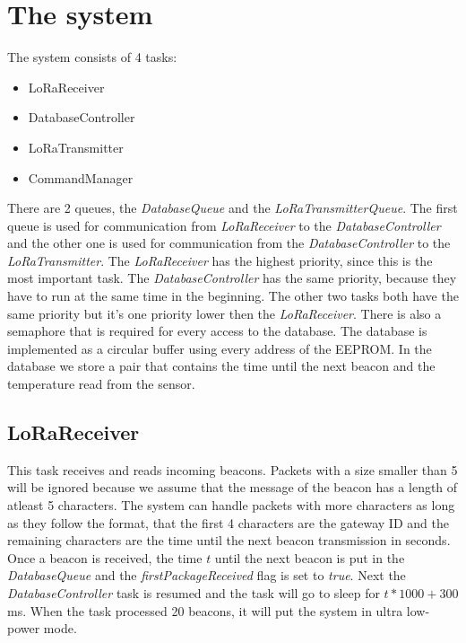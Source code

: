 \documentclass{scrartcl}
\begin{document}


\pagestyle{scrheadings}
\clearscrheadfoot

\cfoot{\pagemark}

\newpage

\section{The system}
The system consists of 4 tasks:
\begin{itemize}
    \item LoRaReceiver
    \item DatabaseController
    \item LoRaTransmitter
    \item CommandManager
\end{itemize}

There are 2 queues, the \textit{DatabaseQueue} and the \textit{LoRaTransmitterQueue}.
The first queue is used for communication from \textit{LoRaReceiver} to the \textit{DatabaseController} and the
other one is used for communication from the \textit{DatabaseController} to the \textit{LoRaTransmitter}.
The \textit{LoRaReceiver} has the highest priority, since this is the most important task.
The \textit{DatabaseController} has the same priority, because they have to run at the same time in the beginning.
The other two tasks both have the same priority but it's one priority lower then the \textit{LoRaReceiver}.
There is also a semaphore that is required for every access to the database.
The database is implemented as a circular buffer using every address of the EEPROM.
In the database we store a pair that contains the time until the next beacon and the temperature read from the sensor.

\subsection{LoRaReceiver}
This task receives and reads incoming beacons. Packets with a size smaller than 5 will be ignored because
we assume that the message of the beacon has a length of atleast 5 characters. The system can handle packets with more characters
as long as they follow the format, that the first 4 characters are the gateway ID and the remaining characters are the time until the
next beacon transmission in seconds. Once a beacon is received, the time $t$ until the next beacon is put in the \textit{DatabaseQueue} and
the \textit{firstPackageReceived} flag is set to \textit{true}.
Next the \textit{DatabaseController} task is resumed and the task will go to sleep for $t*1000 + 300$ \si{\milli\second}.
When the task processed 20 beacons, it will put the system in ultra low-power mode.
\end{document}
